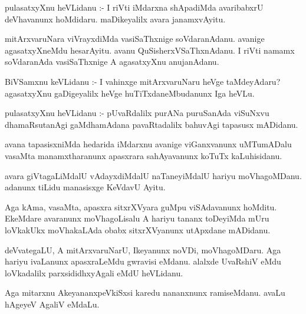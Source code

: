 \documentclass{article}
\begin{document}
\begin{mn}
pulasatxyXnu  heVLidanu :- I riVti  iMdarxna  shApadiMda  avaribabxrU  deVhavanunx  hoMdidaru.  
maDikeyalilx  avara  janamxvAyitu.
\end{mn}

\begin{mn}
mitArxvaruNara  viVrayxdiMda  vasiSaThxnige  soVdaranAdanu.  avanige  agasatxyXneMdu  hesarAyitu.  
avanu  QuSisherxVSaThxnAdanu.  I riVti  namamx  soVdaranAda  vasiSaThxnige  A  agasatxyXnu  anujanAdanu.
\end{mn}

\begin{mn}
BiVSamxnu  keVLidanu :- I vahinxge  mitArxvaruNaru  heVge  taMdeyAdaru?  agasatxyXnu  gaDigeyalilx  heVge  
huTiTxdaneMbudanunx  Iga  heVLu.
\end{mn}

\begin{mn}  
pulasatxyXnu  heVLidanu :- pUvaRdalilx  purANa puruSanAda  viSuNxvu  dhamaRsutanAgi  gaMdhamAdana  
pavaRtadalilx  bahuvAgi  tapasusx  mADidanu.  
\end{mn}

\begin{mn}
avana  tapasisxniMda  hedarida  iMdarxnu  avanige  viGanxvanunx  uMTumADalu  vasaMta  
manamxtharanunx  apasxrara  sahAyavanunx  koTuTx  kaLuhisidanu.
\end{mn}

\begin{mn}
avara  giVtagaLiMdalU  vAdayxdiMdalU  naTaneyiMdalU  hariyu  moVhagoMDanu.  adanunx  tiLidu  manasisxge  KeVdavU  Ayitu.
\end{mn}

\begin{mn}
Aga  kAma,  vasaMta,  apasxra sitxrXVyara  guMpu  viSAdavanunx  hoMditu.  EkeMdare  avaranunx  moVhagoLisalu  
A  hariyu  tananx  toDeyiMda  mUru  loVkakUkx  moVhakaLAda  obabx  sitxrXVyanunx  utApxdane  mADidanu.
\end{mn}

\begin{mn}
deVvategaLU,  A  mitArxvaruNarU,  Ikeyanunx  noVDi,  moVhagoMDaru.  Aga  hariyu  ivaLanunx  apasxraLeMdu  
gwravisi  eMdanu.  alalxde  UvaRshiV  eMdu  loVkadalilx  parxsididhxyAgali  eMdU  heVLidanu.
\end{mn}

\begin{mn}
Aga  mitarxnu  AkeyananxpeVkiSxsi  karedu  nananxnunx  ramiseMdanu.  avaLu  hAgeyeV  AgaliV  eMdaLu.
\end{mn}
\end{document}
